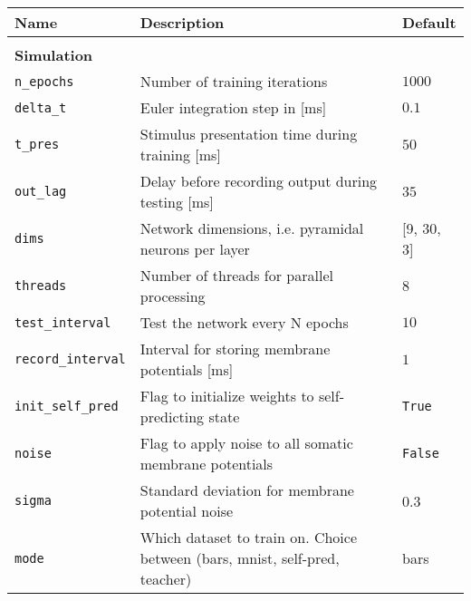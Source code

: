 \begin{table}
  \fontsize{12pt}{12pt}\selectfont
  \begin{center}
    \begin{tabular}{p{}p{}p{}}    \hline
      \textbf{Name}                & \textbf{Description}                                                        &
      \textbf{Default}
      \\
      \hline

      \\\textbf{Simulation} \\\hline
      \texttt{n\_epochs}           & Number of training iterations                                               &
      $1000$
      \\
      \texttt{delta\_t}            & Euler integration step in [ms]                                              & $0.1$
      \\
      \texttt{t\_pres}             & Stimulus presentation time during training [ms]                             & $50$
      \\
      \texttt{out\_lag}            & Delay before recording output during testing [ms]                           & $35$
      \\
      \texttt{dims}                & Network dimensions, i.e. pyramidal neurons per layer                        & [9,
          30, 3]
      \\
      \texttt{threads}             & Number of threads for parallel processing                                   & $8$
      \\
      \texttt{test\_interval}      & Test the network every N epochs                                             & $10$
      \\
      \texttt{record\_interval}    & Interval for storing membrane potentials [ms]                               & $1$
      \\
      \texttt{init\_self\_pred}    & Flag to initialize weights to self-predicting state                         &
      \texttt{True}
      \\
      \texttt{noise}               & Flag to apply noise to all somatic membrane potentials                      &
      \texttt{False}
      \\
      \texttt{sigma}               & Standard deviation for membrane potential noise                             & 0.3
      \\
      \texttt{mode}                & Which dataset to train on. Choice between (bars, mnist, self-pred, teacher) & bars

\end{tabular}
\end{center}
\end{table}
